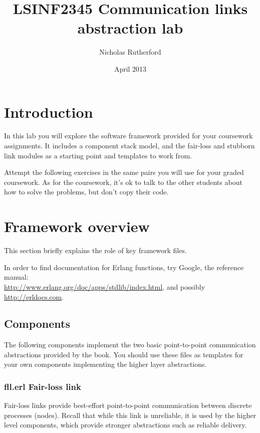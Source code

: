 \documentclass[a4paper]{article}
\title{LSINF2345 Communication links abstraction lab}
\author{Nicholas Rutherford}
\date{April 2013}
\begin{document}
\lstset{language=erlang}

\ifpdf
{}
\else
{}
\fi

\maketitle


\section{Introduction}

In this lab you will explore the software framework provided
for your coursework assignments. It includes a component stack model, and the
fair-loss and stubborn link modules as a starting point and templates to work
from.

Attempt the following exercises in the same pairs you will use for your graded
coursework. As for the coursework, it's ok to talk to the other students about
how to solve the problems, but don't copy their code.

\section{Framework overview} %
\label{sec:framework_overview}

This section briefly explains the role of key framework files.

In order to find documentation for Erlang functions, try Google, the reference
manual: \\
\url{http://www.erlang.org/doc/apps/stdlib/index.html}, and possibly
\url{http://erldocs.com}.

\subsection{Components} %
\label{sub:components}

The following components implement the two basic point-to-point communication
abstractions provided by the book. You should use these files as templates
for your own components implementing the higher layer abstractions.

\subsubsection{fll.erl Fair-loss link} %
\label{ssub:fll_erl}

Fair-loss links provide best-effort point-to-point communication between
discrete processes (nodes). Recall that while this link is unreliable, it is
used by the higher level components, which provide stronger abstractions such
as reliable delivery.
\end{document}
